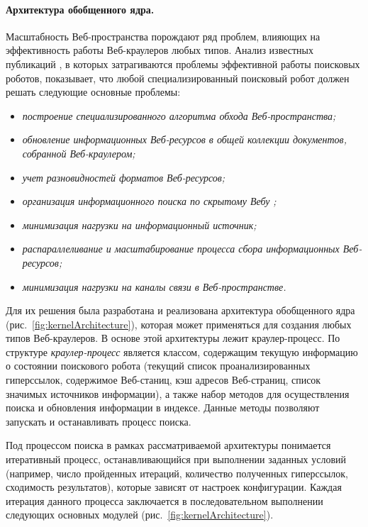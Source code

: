 \paragraph{Архитектура обобщенного ядра.} Масштабность Веб-пространства порождают ряд проблем, влияющих на эффективность работы Веб-краулеров любых типов. Анализ известных публикаций \cite{ArasuChoGM,ChoGM,NajorkHeydon,RaghavanGM}, в которых затрагиваются проблемы эффективной работы поисковых роботов, показывает, что любой специализированный поисковый робот должен решать следующие основные проблемы:
\begin{itemize}
	\item \textit{построение специализированного алгоритма обхода Веб-пространства;}
	\item \textit{обновление информационных Веб-ресурсов в общей коллекции документов, собранной Веб-краулером;}
	\item \textit{учет разновидностей форматов Веб-ресурсов;}
	\item \textit{организация информационного поиска по скрытому Вебу} \cite{RaghavanGM}\textit{;}
	\item \textit{минимизация нагрузки на информационный источник;}
	\item \textit{распараллеливание и масштабирование процесса сбора информационных Веб-ресурсов;}
	\item \textit{минимизация нагрузки на каналы связи в Веб-пространстве.}
\end{itemize}

Для их решения была разработана и реализована архитектура обобщенного ядра (рис.~\cref{fig:kernelArchitecture}), которая может применяться для создания любых типов Веб-краулеров. В основе этой архитектуры лежит краулер-процесс. По структуре \textit{краулер-процесс} является классом, содержащим текущую информацию о состоянии поискового робота (текущий список проанализированных гиперссылок, содержимое Веб-станиц, кэш адресов Веб-страниц, список значимых источников информации), а также набор методов для осуществления поиска и обновления информации в индексе. Данные методы позволяют запускать и останавливать процесс поиска.

Под процессом поиска в рамках рассматриваемой архитектуры понимается итеративный процесс, останавливающийся при выполнении заданных условий (например, число пройденных итераций, количество полученных гиперссылок, сходимость результатов), которые зависят от настроек конфигурации. Каждая итерация данного процесса заключается в последовательном выполнении следующих основных модулей (рис.~\cref{fig:kernelArchitecture}).


